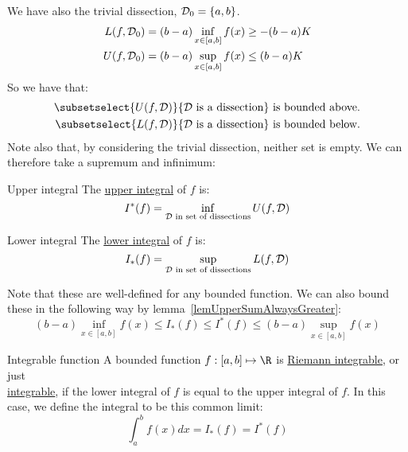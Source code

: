 \documentclass[../Main.tex]{subfiles}
\begin{document}
We have also the trivial dissection, $\mathcal{D}_0 = \{a, b\}$.
\begin{align*}
    L(f, \mathcal{D}_0) &= (b - a) \inf_{x \in [a, b]} f(x) \geq -(b - a)K \\
    U(f, \mathcal{D}_0) &= (b - a) \sup_{x \in [a, b]} f(x) \leq (b - a)K
\end{align*}
So we have that:
\begin{align*}
    \subsetselect{U(f, \dissec)}{\dissec \text{ is a dissection}} \text{ is bounded above.}\\
    \subsetselect{L(f, \dissec)}{\dissec \text{ is a dissection}} \text{ is bounded below.}
\end{align*}
Note also that, by considering the trivial dissection, neither set is empty. We can therefore take a supremum and infinimum:
\begin{definition}{Upper integral}
    The \underline{upper integral} of $f$ is:
    \begin{equation*}
        I^*(f) = \inf_{\mathcal{D}\text{ in set of dissections}} U(f, \mathcal{D})
    \end{equation*}
\end{definition}
\begin{definition}{Lower integral}
    The \underline{lower integral} of $f$ is:
    \begin{equation*}
        I_*(f) = \sup_{\mathcal{D}\text{ in set of dissections}} L(f, \mathcal{D})
    \end{equation*}
\end{definition}
Note that these are well-defined for any bounded function. We can also bound these in the following way by lemma~\ref{lemUpperSumAlwaysGreater}:
\begin{equation*}
    (b - a)\inf_{x \in [a, b]}f(x) \leq I_*(f) \leq I^*(f) \leq (b - a) \sup_{x \in [a, b]}f(x)
\end{equation*}
\begin{definition}{Integrable function}
    A bounded function $f : [a, b] \mapsto \R$ is \underline{Riemann integrable}, or just\\\underline{integrable}, if the lower integral of $f$ is equal to the upper integral of $f$. In this case, we define the integral to be this common limit:
    \begin{equation*}
        \int_a^b f(x) dx = I_*(f) = I^*(f)
    \end{equation*}
\end{definition}
\end{document}
